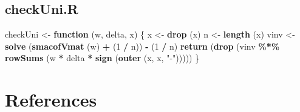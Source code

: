 \documentclass[
  12pt,
]{article}
\newenvironment{Shaded}{\begin{snugshade}}{\end{snugshade}}
\newcommand{\ControlFlowTok}[1]{\textcolor[rgb]{0.13,0.29,0.53}{\textbf{#1}}}
\newcommand{\DecValTok}[1]{\textcolor[rgb]{0.00,0.00,0.81}{#1}}
\newcommand{\FunctionTok}[1]{\textcolor[rgb]{0.13,0.29,0.53}{\textbf{#1}}}
\newcommand{\NormalTok}[1]{#1}
\newcommand{\OtherTok}[1]{\textcolor[rgb]{0.56,0.35,0.01}{#1}}
\newcommand{\SpecialCharTok}[1]{\textcolor[rgb]{0.81,0.36,0.00}{\textbf{#1}}}
\newcommand{\StringTok}[1]{\textcolor[rgb]{0.31,0.60,0.02}{#1}}
\begin{document}
\hypertarget{checkuni.r}{%
\subsection{checkUni.R}\label{checkuni.r}}

\begin{Shaded}
\begin{Highlighting}[]
\NormalTok{checkUni }\OtherTok{\textless{}{-}} \ControlFlowTok{function}\NormalTok{ (w, delta, x) \{}
\NormalTok{  x }\OtherTok{\textless{}{-}} \FunctionTok{drop}\NormalTok{ (x)}
\NormalTok{  n }\OtherTok{\textless{}{-}} \FunctionTok{length}\NormalTok{ (x)}
\NormalTok{  vinv }\OtherTok{\textless{}{-}} \FunctionTok{solve}\NormalTok{ (}\FunctionTok{smacofVmat}\NormalTok{ (w) }\SpecialCharTok{+}\NormalTok{ (}\DecValTok{1} \SpecialCharTok{/}\NormalTok{ n)) }\SpecialCharTok{{-}}\NormalTok{ (}\DecValTok{1} \SpecialCharTok{/}\NormalTok{ n)}
  \FunctionTok{return}\NormalTok{ (}\FunctionTok{drop}\NormalTok{ (vinv }\SpecialCharTok{\%*\%} \FunctionTok{rowSums}\NormalTok{ (w }\SpecialCharTok{*}\NormalTok{ delta }\SpecialCharTok{*} \FunctionTok{sign}\NormalTok{ (}\FunctionTok{outer}\NormalTok{ (x, x, }\StringTok{"{-}"}\NormalTok{)))))}
\NormalTok{\}}
\end{Highlighting}
\end{Shaded}

\hypertarget{references}{%
\section*{References}\label{references}}
\end{document}
